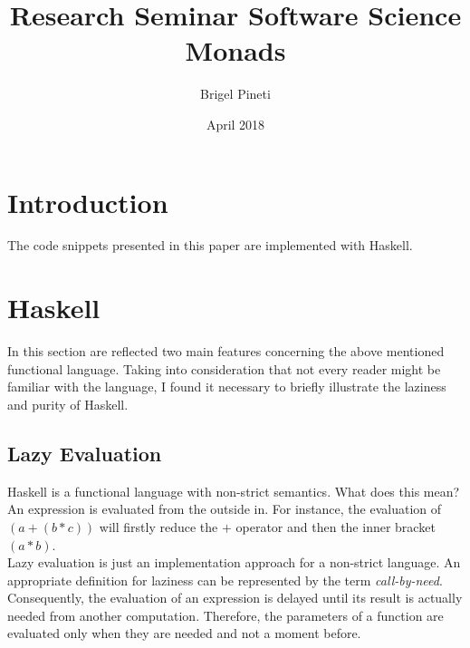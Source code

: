 \documentclass[a4paper, twocolumn]{article}
\title{\Large{Research Seminar Software Science} \\
\huge{Monads}}
\author{Brigel Pineti}
\date{April 2018}
\begin{document}
\maketitle

\section{Introduction}

The code snippets presented in this paper are implemented with Haskell. 

\section{Haskell}

In this section are reflected two main features concerning the above mentioned functional language. Taking into consideration that not every reader might be familiar with the language, I found it necessary to briefly illustrate the laziness and purity of Haskell.  

\subsection{Lazy Evaluation}

Haskell is a functional language with non-strict semantics. What does this mean? An expression is evaluated from the outside in. For instance, the evaluation of \textit{$(a + (b * c))$} will firstly reduce the \textit{$+$} operator and then the inner bracket \textit{$(a * b)$}. \\
Lazy evaluation is just an implementation approach for a non-strict language. An appropriate definition for laziness can be represented by the term \textit{call-by-need}. Consequently, the evaluation of an expression is delayed until its result is actually needed from another computation. Therefore, the parameters of a function are evaluated only when they are needed and not a moment before. 
\end{document}
